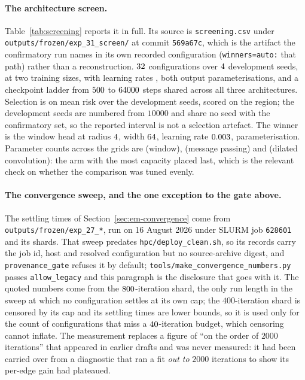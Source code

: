 \paragraph{The architecture screen.} Table~\ref{tab:screening} reports it in
full. Its source is \texttt{screening.csv} under
\texttt{outputs/frozen/exp\_31\_screen/} at commit \texttt{569a67c}, which is the
artifact the confirmatory run names in its own recorded configuration
(\texttt{winners=auto:} that path) rather than a reconstruction. $32$ configurations over $4$
development seeds, at two training sizes, with learning rates
\screenlrs{}, both output parameterisations, and a checkpoint ladder from
$500$ to $64000$ steps shared across all three
architectures. Selection is on mean risk over the development seeds, scored on
the \screenregion{} region; the development seeds are numbered from $10000$ and
share no seed with the confirmatory set, so the reported interval is not a
selection artefact. The winner is the window head at radius
$4$, width $64$, learning rate
$0.003$, \screenwinnermode{} parameterisation. Parameter counts
across the grids are \screenwindowparams{} (window), \screenbimpparams{}
(message passing) and \screenconvparams{} (dilated convolution): the arm with
the most capacity placed last, which is the relevant check on whether the
comparison was tuned evenly.

\paragraph{The convergence sweep, and the one exception to the gate above.}
The settling times of Section~\ref{sec:em-convergence} come from
\texttt{outputs/frozen/exp\_27\_*}, run on 16 August 2026 under SLURM job
\texttt{628601} and its shards. That sweep predates
\texttt{hpc/deploy\_clean.sh}, so its records carry the job id, host and
resolved configuration but no source-archive digest, and
\texttt{provenance\_gate} refuses it by default;
\texttt{tools/make\_convergence\_numbers.py} passes \texttt{allow\_legacy} and
this paragraph is the disclosure that goes with it. The quoted numbers come
from the $800$-iteration shard, the only run length in the sweep at which
no configuration settles at its own cap; the $400$-iteration shard is censored
by its cap and its settling times are lower bounds, so it is used only for the
count of configurations that miss a $40$-iteration budget, which
censoring cannot inflate. The measurement replaces a figure of ``on the order of
$2000$ iterations'' that appeared in earlier drafts and was never measured: it
had been carried over from a diagnostic that ran a fit \emph{out to} $2000$
iterations to show its per-edge gain had plateaued.


